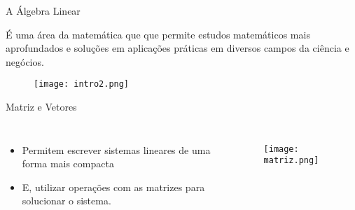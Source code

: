 \begin{frame}[t]{A Álgebra Linear} 

 É uma área da matemática que que permite estudos matemáticos mais aprofundados e soluções em aplicações práticas em diversos campos da ciência e negócios.


 \vspace*{0.8cm}

\begin{figure}
    \texttt{[image: intro2.png]}
\end{figure}
            
\end{frame}

\begin{frame}[t]{Matriz e Vetores} 
    \begin{columns}
        \begin{itemize}
            \item Permitem escrever sistemas lineares de uma forma mais compacta
            \item E, utilizar operações com as matrizes para solucionar o sistema.
        \end{itemize}
        \begin{figure}
            \texttt{[image: matriz.png]}
        \end{figure}
    \end{columns}
\end{frame}
